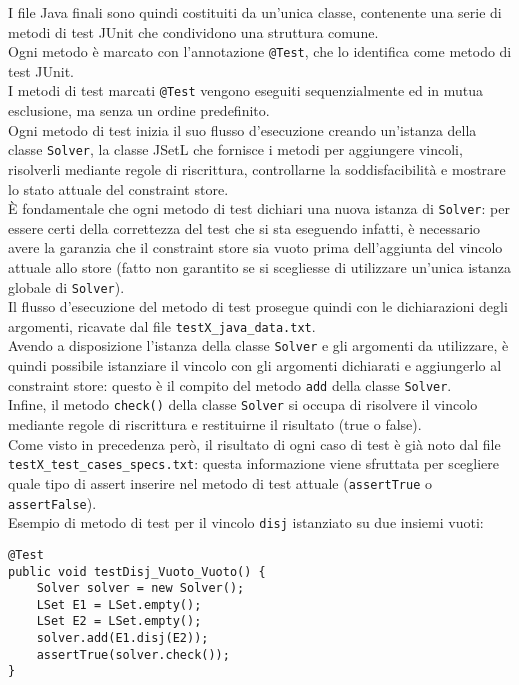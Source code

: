 I file Java finali sono quindi costituiti da un'unica classe, contenente una serie di metodi di test JUnit che condividono una struttura comune.\\
Ogni metodo è marcato con l'annotazione \texttt{@Test}, che lo identifica come metodo di test JUnit.\\
I metodi di test marcati \texttt{@Test} vengono eseguiti sequenzialmente ed in mutua esclusione, ma senza un ordine predefinito.\\
Ogni metodo di test inizia il suo flusso d'esecuzione creando un'istanza della classe \texttt{Solver}, la classe JSetL che fornisce i metodi per aggiungere vincoli, risolverli mediante regole di riscrittura, controllarne la soddisfacibilità e mostrare lo stato attuale del constraint store.\\
È fondamentale che ogni metodo di test dichiari una nuova istanza di \texttt{Solver}: per essere certi della correttezza del test che si sta eseguendo infatti, è necessario avere la garanzia che il constraint store sia vuoto prima dell'aggiunta del vincolo attuale allo store (fatto non garantito se si scegliesse di utilizzare un'unica istanza globale di \texttt{Solver}).\\
Il flusso d'esecuzione del metodo di test prosegue quindi con le dichiarazioni degli argomenti, ricavate dal file \texttt{testX\_java\_data.txt}.\\
Avendo a disposizione l'istanza della classe \texttt{Solver} e gli argomenti da utilizzare, è quindi possibile istanziare il vincolo con gli argomenti dichiarati e aggiungerlo al constraint store: questo è il compito del metodo \texttt{add} della classe \texttt{Solver}.\\
Infine, il metodo \texttt{check()} della classe \texttt{Solver} si occupa di risolvere il vincolo mediante regole di riscrittura e restituirne il risultato (true o false).\\
Come visto in precedenza però, il risultato di ogni caso di test è già noto dal file \texttt{testX\_test\_cases\_specs.txt}: questa informazione viene sfruttata per scegliere quale tipo di assert inserire nel metodo di test attuale (\texttt{assertTrue} o \texttt{assertFalse}).\\

Esempio di metodo di test per il vincolo \texttt{disj} istanziato su due insiemi vuoti:\\

\begin{lstlisting}
@Test
public void testDisj_Vuoto_Vuoto() {
    Solver solver = new Solver();
    LSet E1 = LSet.empty();
    LSet E2 = LSet.empty();
    solver.add(E1.disj(E2));
    assertTrue(solver.check());
}
\end{lstlisting}

